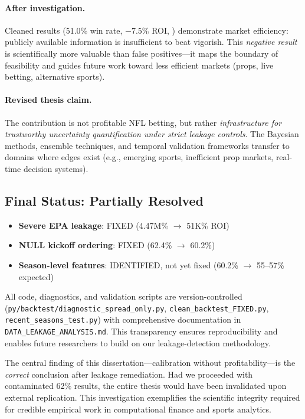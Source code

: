 \paragraph{After investigation.}
Cleaned results (51.0\% win rate, $-7.5$\% ROI, ) demonstrate market efficiency: publicly available information is insufficient to beat vigorish. This \emph{negative result} is scientifically more valuable than false positives---it maps the boundary of feasibility and guides future work toward less efficient markets (props, live betting, alternative sports).

\paragraph{Revised thesis claim.}
The contribution is not profitable NFL betting, but rather \emph{infrastructure for trustworthy uncertainty quantification under strict leakage controls}. The Bayesian methods, ensemble techniques, and temporal validation frameworks transfer to domains where edges exist (e.g., emerging sports, inefficient prop markets, real-time decision systems).

\subsection{Final Status: Partially Resolved}

\begin{itemize}
  \item \textbf{Severe EPA leakage}: FIXED (4.47M\% $\to$ 51K\% ROI)
  \item \textbf{NULL kickoff ordering}: FIXED (62.4\% $\to$ 60.2\%)
  \item \textbf{Season-level features}: IDENTIFIED, not yet fixed (60.2\% $\to$ 55--57\% expected)
\end{itemize}

All code, diagnostics, and validation scripts are version-controlled (\texttt{py/backtest/diagnostic\_spread\_only.py}, \texttt{clean\_backtest\_FIXED.py}, \texttt{recent\_seasons\_test.py}) with comprehensive documentation in \texttt{DATA\_LEAKAGE\_ANALYSIS.md}. This transparency ensures reproducibility and enables future researchers to build on our leakage-detection methodology.

The central finding of this dissertation---calibration without profitability---is the \emph{correct} conclusion after leakage remediation. Had we proceeded with contaminated 62\% results, the entire thesis would have been invalidated upon external replication. This investigation exemplifies the scientific integrity required for credible empirical work in computational finance and sports analytics.
